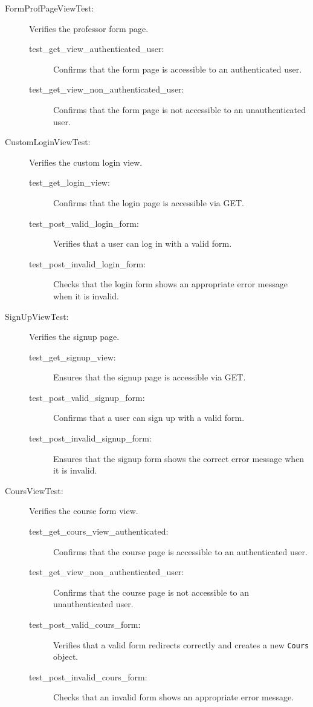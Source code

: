 \documentclass[12pt]{article}
\begin{document}
\begin{description}
  \item[FormProfPageViewTest:] Verifies the professor form page.
  \begin{description}
    \item[test\_get\_view\_authenticated\_user:] Confirms that the form page is accessible to an authenticated user.
    \item[test\_get\_view\_non\_authenticated\_user:] Confirms that the form page is not accessible to an unauthenticated user.
  \end{description}

  \item[CustomLoginViewTest:] Verifies the custom login view.
  \begin{description}
    \item[test\_get\_login\_view:] Confirms that the login page is accessible via GET.
    \item[test\_post\_valid\_login\_form:] Verifies that a user can log in with a valid form.
    \item[test\_post\_invalid\_login\_form:] Checks that the login form shows an appropriate error message when it is invalid.
  \end{description}

  \item[SignUpViewTest:] Verifies the signup page.
  \begin{description}
    \item[test\_get\_signup\_view:] Ensures that the signup page is accessible via GET.
    \item[test\_post\_valid\_signup\_form:] Confirms that a user can sign up with a valid form.
    \item[test\_post\_invalid\_signup\_form:] Ensures that the signup form shows the correct error message when it is invalid.
  \end{description}

  \item[CoursViewTest:] Verifies the course form view.
  \begin{description}
    \item[test\_get\_cours\_view\_authenticated:] Confirms that the course page is accessible to an authenticated user.
    \item[test\_get\_view\_non\_authenticated\_user:] Confirms that the course page is not accessible to an unauthenticated user.
    \item[test\_post\_valid\_cours\_form:] Verifies that a valid form redirects correctly and creates a new \texttt{Cours} object.
    \item[test\_post\_invalid\_cours\_form:] Checks that an invalid form shows an appropriate error message.
  \end{description}


\end{description}
\end{document}
